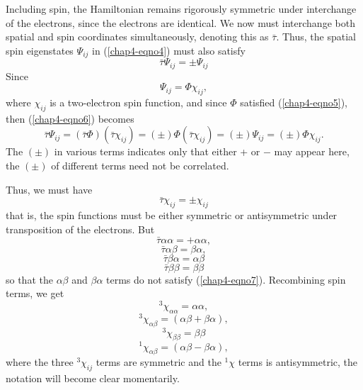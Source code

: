 Including spin, the Hamiltonian remains rigorously symmetric under
interchange of the electrons, since the electrons are identical.  We
now must interchange both spatial and spin coordinates simultaneously,
denoting this as ${\bar \tau}$.  Thus, the spatial spin eigenstates
$\Psi_{ij}$ in (\ref{chap4-eqno4}) must also satisfy
\begin{equation}
{\bar \tau} \Psi_{ij} = \pm \Psi_{ij} 
\label{chap4-eqno6}
\end{equation}
Since
\begin{equation}
\Psi_{ij} = \Phi \chi_{ij} ,
\end{equation}
where $\chi_{ij}$ is a two-electron spin function, and since $\Phi$
satisfied (\ref{chap4-eqno5}), then (\ref{chap4-eqno6}) becomes
\begin{equation}
{\bar \tau} \Psi_{ij} = \left( {\bar \tau} \Phi \right) \left( {\bar 
\tau} \chi_{ij} \right) = ( \pm ) \Phi ( {\bar \tau} \chi_{ij} ) = ( 
\pm ) \Psi_{ij} = ( \pm ) \Phi \chi_{ij} .
\end{equation}
The $( \pm )$ in various terms indicates only that either + or $-$ may 
appear here, the $( \pm )$ of different terms need not be correlated.

Thus, we must have
\begin{equation}
{\bar \tau} \chi_{ij} = \pm \chi_{ij}
\label{chap4-eqno7}
\end{equation}
that is, the spin functions must be either symmetric or antisymmetric
under transposition of the electrons. But
\begin{equation}
{\bar \tau} \alpha \alpha = + \alpha \alpha ,
\end{equation}
\begin{equation}
{\bar \tau} \alpha \beta = \beta \alpha ,
\end{equation}
\begin{equation}
{\bar \tau} \beta \alpha = \alpha \beta
\end{equation}
\begin{equation}
{\bar \tau} \beta \beta = \beta \beta
\end{equation}
so that the $\alpha \beta$ and $\beta \alpha$ terms do not satisfy
(\ref{chap4-eqno7}).  Recombining spin terms, we get
\begin{equation}
^3\chi_{\alpha \alpha} = \alpha \alpha ,
\end{equation}
\begin{equation}
^3\chi_{\alpha \beta} = \left( \alpha \beta + \beta \alpha \right) ,
\end{equation}
\begin{equation}
^3\chi_{\beta \beta} = \beta \beta
\end{equation}
\begin{equation}
^1\chi_{\alpha \beta} = ( \alpha \beta - \beta \alpha ) ,
\end{equation}
where the three $^3\chi_{ij}$ terms are symmetric and the $^1\chi$ terms is 
antisymmetric, the notation will become clear momentarily.

